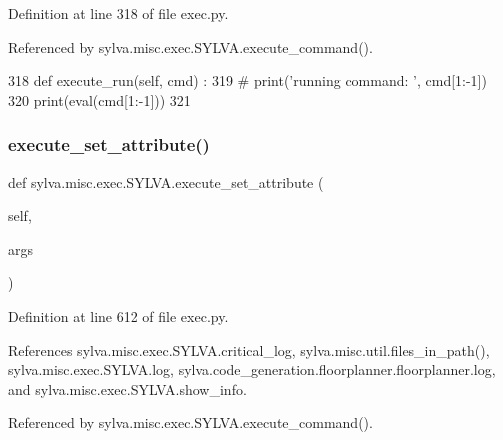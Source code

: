 Definition at line 318 of file exec.\+py.



Referenced by sylva.\+misc.\+exec.\+S\+Y\+L\+V\+A.\+execute\+\_\+command().


\begin{DoxyCode}
318   \textcolor{keyword}{def }execute\_run(self, cmd) :
319     \textcolor{comment}{# print('running command: ', cmd[1:-1])}
320     print(eval(cmd[1:-1]))
321 
\end{DoxyCode}
\mbox{\label{classsylva_1_1misc_1_1exec_1_1_s_y_l_v_a_a341672492c585c71c0a030e9de2d399a}} 
\subsubsection{\texorpdfstring{execute\+\_\+set\+\_\+attribute()}{execute\_set\_attribute()}}
{\footnotesize\ttfamily def sylva.\+misc.\+exec.\+S\+Y\+L\+V\+A.\+execute\+\_\+set\+\_\+attribute (\begin{DoxyParamCaption}\item[{}]{self,  }\item[{}]{args }\end{DoxyParamCaption})}



Definition at line 612 of file exec.\+py.



References sylva.\+misc.\+exec.\+S\+Y\+L\+V\+A.\+critical\+\_\+log, sylva.\+misc.\+util.\+files\+\_\+in\+\_\+path(), sylva.\+misc.\+exec.\+S\+Y\+L\+V\+A.\+log, sylva.\+code\+\_\+generation.\+floorplanner.\+floorplanner.\+log, and sylva.\+misc.\+exec.\+S\+Y\+L\+V\+A.\+show\+\_\+info.



Referenced by sylva.\+misc.\+exec.\+S\+Y\+L\+V\+A.\+execute\+\_\+command().


